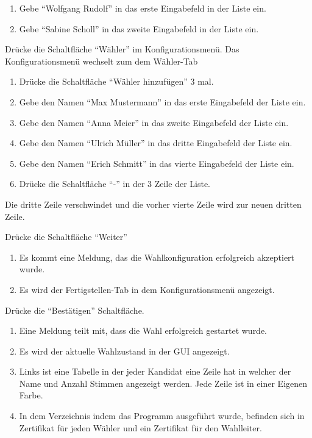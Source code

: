 \documentclass[parskip=full]{scrartcl}
\begin{document}
\teststep{}
		{\begin{enumerate}
			\item Gebe \enquote{Wolfgang Rudolf} in das erste Eingabefeld in der Liste ein.
			\item Gebe \enquote{Sabine Scholl} in das zweite Eingabefeld in der Liste ein.
		\end{enumerate}}
		{}

\teststep{}
		{Drücke die Schaltfläche \enquote{Wähler} im Konfigurationsmenü.}
		{Das Konfigurationsmenü wechselt zum dem Wähler-Tab}

\teststep{}
		{\begin{enumerate}
				\item Drücke die Schaltfläche \enquote{Wähler hinzufügen} 3 mal.
				\item Gebe den Namen \enquote{Max Mustermann} in das erste Eingabefeld der Liste ein.
				\item Gebe den Namen \enquote{Anna Meier} in das zweite Eingabefeld der Liste ein.
				\item Gebe den Namen \enquote{Ulrich Müller} in das dritte Eingabefeld der Liste ein.
				\item Gebe den Namen \enquote{Erich Schmitt} in das vierte Eingabefeld der Liste ein.
				\item Drücke die Schaltfläche \enquote{-} in der 3 Zeile der Liste.
		\end{enumerate}}
		{Die dritte Zeile verschwindet und die vorher vierte Zeile wird zur neuen dritten Zeile.}

\teststep{}
		{Drücke die Schaltfläche \enquote{Weiter}}
		{\begin{enumerate}
				\item Es kommt eine Meldung, das die Wahlkonfiguration erfolgreich akzeptiert wurde.
				\item Es wird der Fertigstellen-Tab in dem Konfigurationsmenü angezeigt.
		\end{enumerate}}

\teststep{}
		{Drücke die \enquote{Bestätigen} Schaltfläche.}
		{\begin{enumerate}
				\item Eine Meldung teilt mit, dass die Wahl erfolgreich gestartet wurde.
				\item Es wird der aktuelle Wahlzustand in der GUI angezeigt.
				\item Links ist eine Tabelle in der jeder Kandidat eine Zeile hat in welcher der Name und Anzahl Stimmen angezeigt werden. Jede Zeile ist in einer Eigenen Farbe.
				\item In dem Verzeichnis indem das Programm ausgeführt wurde, befinden sich in Zertifikat für jeden Wähler und ein Zertifikat für den Wahlleiter.
		\end{enumerate}}
\end{document}
